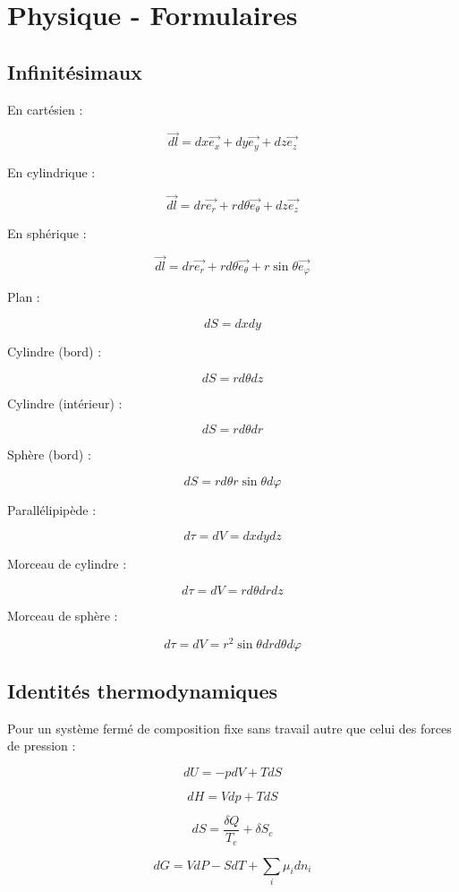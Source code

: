 \documentclass[a4paper,12pt]{book}
\newcommand{\Def}[2]{\begin{tcolorbox}[colback=white,colframe=red!10!green!20!blue!75!, title=Définition : #1]#2\end{tcolorbox}}
\renewcommand{\Vec}[1]{\overrightarrow{#1}}
\begin{document}
\chapter{Physique - Formulaires}
\section{Infinitésimaux}
\Def{Déplacements}{En cartésien :
\par $$\Vec{dl} = dx\Vec{e_x}+dy\Vec{e_y}+dz\Vec{e_z}$$
\par En cylindrique :
\par $$\Vec{dl} = dr\Vec{e_r} +rd\theta\Vec{e_\theta}+dz\Vec{e_z}$$
\par En sphérique :
\par $$\Vec{dl} = dr\Vec{e_r} +rd\theta\Vec{e_\theta}+r\sin\theta\Vec{e_\varphi}$$}
\Def{Surfaces}{Plan :
\par $$dS = dxdy$$
\par Cylindre (bord) :
\par $$dS = rd\theta dz$$
\par Cylindre (intérieur) :
\par $$dS = rd\theta dr$$
\par Sphère (bord) :
\par $$dS = rd\theta r\sin\theta d\varphi$$}
\Def{Volumes}{Parallélipipède :
\par $$d\tau = dV = dxdydz$$
\par Morceau de cylindre :
\par $$d\tau = dV = rd\theta drdz$$
\par Morceau de sphère :
\par $$d\tau = dV = r^2\sin\theta drd\theta d\varphi$$}



\section{Identités thermodynamiques}
Pour un système fermé de composition fixe sans travail autre que celui des forces de pression :
\par $$dU = -pdV + TdS$$
\par $$dH = Vdp + TdS$$
\par $$dS = \frac{\delta Q}{T_e}+\delta S_c$$
\par $$dG = VdP -SdT+\sum\limits_i\mu_i dn_i$$
\end{document}
